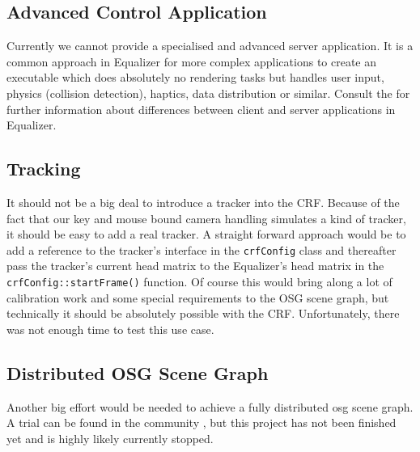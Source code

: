 \subsection{Advanced Control Application}
Currently we cannot provide a specialised and advanced server application. It is a common approach in Equalizer for more complex applications to create an executable which does absolutely no rendering tasks but handles user input, physics (collision detection), haptics, data distribution or similar. Consult the \cite{eqPG} for further information about differences between client and server applications in Equalizer.

\subsection{Tracking}
It should not be a big deal to introduce a tracker into the CRF. Because of the fact that our key and mouse bound camera handling simulates a kind of tracker, it should be easy to add a real tracker. A straight forward approach would be to add a reference to the tracker's interface in the \texttt{crfConfig} class and thereafter pass the tracker's current head matrix to the Equalizer's head matrix in the \texttt{crfConfig::startFrame()} function. Of course this would bring along a lot of calibration work and some special requirements to the OSG scene graph, but technically it should be absolutely possible with the CRF. Unfortunately, there was not enough time to test this use case.

\subsection{Distributed OSG Scene Graph}
Another big effort would be needed to achieve a fully distributed \gls{osg} scene graph. A trial can be found in the community \cite{distOSG}, but this project has not been finished yet and is highly likely currently stopped. 